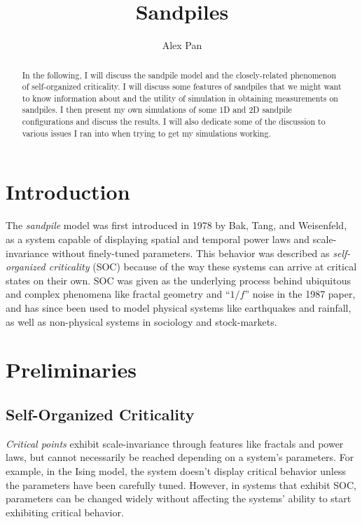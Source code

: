 \documentclass{article}
\title{\vspace{-2cm}Sandpiles} %
\author{Alex Pan}
\date{} %
\begin{document}
\maketitle

\begin{abstract}
In the following, I will discuss the sandpile model and the closely-related phenomenon of self-organized criticality. I will discuss some features of sandpiles that we might want to know information about and the utility of simulation in obtaining measurements on sandpiles. I then present my own simulations of some 1D and 2D sandpile configurations and discuss the results. I will also dedicate some of the discussion to various issues I ran into when trying to get my simulations working.
\end{abstract}

\section{Introduction}
The \textit{sandpile} model was first introduced in 1978 by Bak, Tang, and Weisenfeld, as a system capable of displaying spatial and temporal power laws and scale-invariance without finely-tuned parameters. This behavior was described as \textit{self-organized criticality} (SOC) because of the way these systems can arrive at critical states on their own. SOC was given as the underlying process behind ubiquitous and complex phenomena like fractal geometry and ``$1/f$'' noise in the 1987 paper, and has since been used to model physical systems like earthquakes and rainfall, as well as non-physical systems in sociology and stock-markets.

\section{Preliminaries}
\subsection{Self-Organized Criticality}
\textit{Critical points} exhibit scale-invariance through features like fractals and power laws, but cannot necessarily be reached depending on a system's parameters. For example, in the Ising model, the system doesn't display critical behavior unless the parameters have been carefully tuned. However, in systems that exhibit SOC, parameters can be changed widely without affecting the systems' ability to start exhibiting critical behavior.
\end{document}

